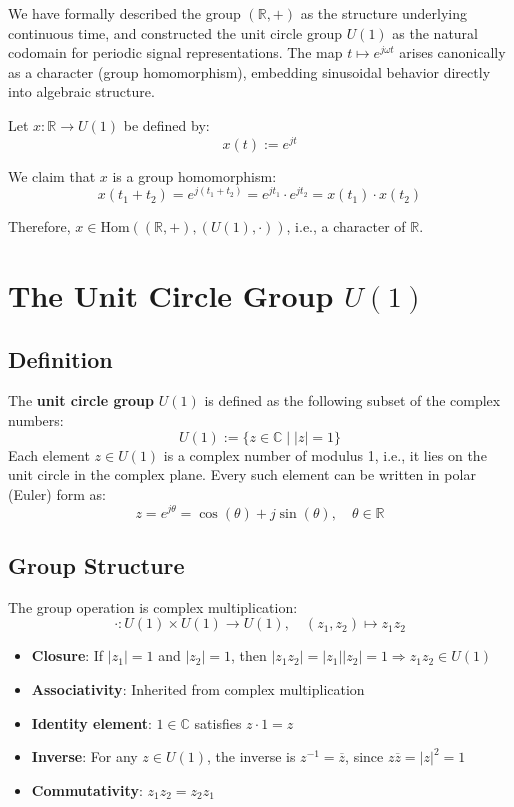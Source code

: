 \documentclass[12pt]{article}
\begin{document}
	We have formally described the group \((\mathbb{R}, +)\) as the structure underlying continuous time, and constructed the unit circle group \(U(1)\) as the natural codomain for periodic signal representations. The map \( t \mapsto e^{j \omega t} \) arises canonically as a character (group homomorphism), embedding sinusoidal behavior directly into algebraic structure.
	
	Let \( x \colon \mathbb{R} \to U(1) \) be defined by:
	\[
	x(t) := e^{j t}
	\]
	
	We claim that \( x \) is a group homomorphism:
	\[
	x(t_1 + t_2) = e^{j(t_1 + t_2)} = e^{j t_1} \cdot e^{j t_2} = x(t_1) \cdot x(t_2)
	\]
	
	Therefore, \( x \in \mathrm{Hom}((\mathbb{R}, +), (U(1), \cdot)) \), i.e., a character of \( \mathbb{R} \).
	
	\section{The Unit Circle Group \( U(1) \)}
	
	\subsection*{Definition}
	
	The \textbf{unit circle group} \( U(1) \) is defined as the following subset of the complex numbers:
	\[
	U(1) := \{ z \in \mathbb{C} \mid |z| = 1 \}
	\]
	Each element \( z \in U(1) \) is a complex number of modulus 1, i.e., it lies on the unit circle in the complex plane. Every such element can be written in polar (Euler) form as:
	\[
	z = e^{j \theta} = \cos(\theta) + j \sin(\theta), \quad \theta \in \mathbb{R}
	\]
	
	\subsection*{Group Structure}
	
	The group operation is complex multiplication:
	\[
	\cdot\colon U(1) \times U(1) \to U(1), \quad (z_1, z_2) \mapsto z_1 z_2
	\]
	
	\begin{itemize}
		\item \textbf{Closure}: If \( |z_1| = 1 \) and \( |z_2| = 1 \), then \( |z_1 z_2| = |z_1||z_2| = 1 \Rightarrow z_1 z_2 \in U(1) \)
		\item \textbf{Associativity}: Inherited from complex multiplication
		\item \textbf{Identity element}: \( 1 \in \mathbb{C} \) satisfies \( z \cdot 1 = z \)
		\item \textbf{Inverse}: For any \( z \in U(1) \), the inverse is \( z^{-1} = \overline{z} \), since \( z \overline{z} = |z|^2 = 1 \)
		\item \textbf{Commutativity}: \( z_1 z_2 = z_2 z_1 \)
	\end{itemize}
	
\end{document}
